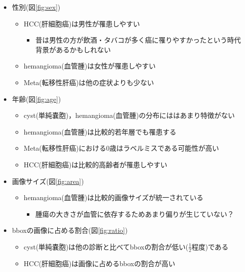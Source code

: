 \documentclass[a4j]{ujarticle}
\newcommand{\Fref}[1]{\mbox{図\ref{fig:#1}}}
\begin{document}
\begin{itemize}
\begin{itemize}
\begin{figure}[h]
                \end{figure}
                \item 性別(\Fref{sex})
                \begin{itemize}
                    \item HCC(肝細胞癌)は男性が罹患しやすい
                    \begin{itemize}
                        \item 昔は男性の方が飲酒・タバコが多く癌に罹りやすかったという時代背景があるかもしれない
                    \end{itemize}
                    \item hemangioma(血管腫)は女性が罹患しやすい
                    \item Meta(転移性肝癌)は他の症状よりも少ない
                \end{itemize}
                \item 年齢(\Fref{age})
                \begin{itemize}
                    \item cyst(単純嚢胞)，hemangioma(血管腫)の分布にははあまり特徴がない
                    \item hemangioma(血管腫)は比較的若年層でも罹患する
                    \item Meta(転移性肝癌)における0歳はラベルミスである可能性が高い
                    \item HCC(肝細胞癌)は比較的高齢者が罹患しやすい
                \end{itemize}
                \item 画像サイズ(\Fref{area})
                \begin{itemize}
                    \item hemangioma(血管腫)は比較的画像サイズが統一されている
                    \begin{itemize}
                        \item 腫瘍の大きさが血管に依存するためあまり偏りが生じていない？
                    \end{itemize}
                \end{itemize}
                \item bboxの画像に占める割合(\Fref{ratio})
                \begin{itemize}
                    \item cyst(単純嚢胞)は他の診断と比べてbboxの割合が低い($\frac{1}{2}$程度)である
                    \item HCC(肝細胞癌)は画像に占めるbboxの割合が高い
                \end{itemize}
            \end{itemize}
        \end{itemize}
\end{document}

